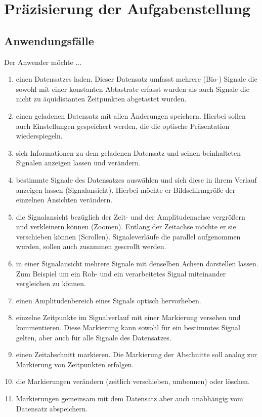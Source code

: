 \chapter{Pr\"azisierung der Aufgabenstellung}

\section{Anwendungsf\"alle}


\renewcommand{\theenumi}{\alph{enumi}}
\renewcommand{\labelenumi}{\theenumi )}
Der Anwender m\"ochte ...
\begin{enumerate}
	\item einen Datensatzes laden. Dieser Datensatz umfasst mehrere (Bio-) Signale die sowohl mit einer konstanten Abtastrate erfasst wurden als auch Signale die nicht zu \"aquidistanten Zeitpunkten abgetastet wurden.
	\item einen geladenen Datensatz mit allen \"Anderungen speichern. Hierbei sollen auch Einstellungen gespeichert werden, die die optische Pr\"asentation wiederspiegeln.
	\item sich Informationen zu dem geladenen Datensatz und seinen beinhalteten Signalen anzeigen lassen und ver\"andern.
	\item bestimmte Signale des Datensatzes ausw\"ahlen und sich diese in ihrem Verlauf anzeigen lassen (Signalansicht). Hierbei m\"ochte er Bildschirmgr\"o\ss e der einzelnen Ansichten ver\"andern.
	\item die Signalansicht bez\"uglich der Zeit- und der Amplitudenachse vergr\"o\ss ern und verkleinern k\"onnen (Zoomen). Entlang der Zeitachse m\"ochte er sie verschieben k\"onnen (Scrollen). Signaleverl\"aufe die parallel aufgenommen wurden, sollen auch zusammen gescrollt werden.
	\item in einer Signalansicht mehrere Signale mit denselben Achsen darstellen lassen. Zum Beispiel um ein Roh- und ein verarbeitetes Signal miteinander vergleichen zu k\"onnen.
	\item einen Amplitudenbereich eines Signals optisch hervorheben.
	\item einzelne Zeitpunkte im Signalverlauf mit einer Markierung versehen und kommentieren. Diese Markierung kann sowohl f\"ur ein bestimmtes Signal gelten, aber auch f\"ur alle Signale des Datensatzes.
	\item einen Zeitabschnitt markieren. Die Markierung der Abschnitte soll analog zur Markierung von Zeitpunkten erfolgen.
	\item die Markierungen ver\"andern (zeitlich verschieben, umbennen) oder l\"oschen.
	\item Markierungen gemeinsam mit dem Datensatz aber auch unabh\"angig vom Datensatz abspeichern.
\end{enumerate}

